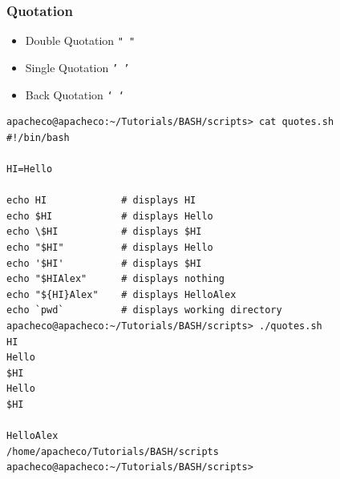 \documentclass[slidestop,mathserif,compress,xcolor=svgnames]{beamer}
\begin{document}
\begin{frame}
  \frametitle{\small Quotation}
  \begin{itemize}
    \item Double Quotation \texttt{" "}
    \item Single Quotation \texttt{' '}
    \item Back Quotation \texttt{` `}
  \end{itemize}
  \tiny{
  \begin{verbatim}
apacheco@apacheco:~/Tutorials/BASH/scripts> cat quotes.sh 
#!/bin/bash

HI=Hello

echo HI             # displays HI
echo $HI            # displays Hello
echo \$HI           # displays $HI
echo "$HI"          # displays Hello
echo '$HI'          # displays $HI
echo "$HIAlex"      # displays nothing
echo "${HI}Alex"    # displays HelloAlex
echo `pwd`          # displays working directory
apacheco@apacheco:~/Tutorials/BASH/scripts> ./quotes.sh 
HI
Hello
$HI
Hello
$HI

HelloAlex
/home/apacheco/Tutorials/BASH/scripts
apacheco@apacheco:~/Tutorials/BASH/scripts>
  \end{verbatim}
  }
\end{frame}
\end{document}
